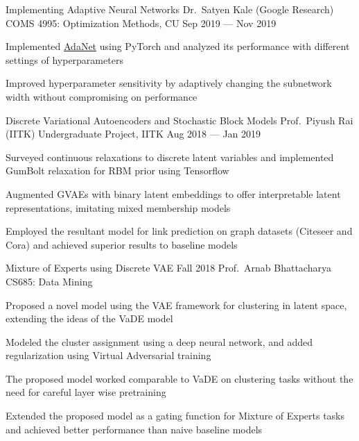 \cventry
	{Implementing Adaptive Neural Networks}
	{Dr.\ Satyen Kale (Google Research)}
	{COMS 4995: Optimization Methods, CU}
	{Sep 2019 --- Nov 2019}
	{%
		\begin{cvitems}
			\item Implemented \href{https://arxiv.org/abs/1607.01097}{AdaNet} using PyTorch and analyzed its performance with different settings of hyperparameters
			\item Improved hyperparameter sensitivity by adaptively changing the subnetwork width without compromising on performance
		\end{cvitems}
	}

\cventry
	{Discrete Variational Autoencoders and Stochastic Block Models}
    {Prof.\ Piyush Rai (IITK)}
	{Undergraduate Project, IITK}
	{Aug 2018 --- Jan 2019}
	{%
		\begin{cvitems}
			\item Surveyed continuous relaxations to discrete latent variables and implemented GumBolt relaxation for RBM prior using Tensorflow
			\item Augmented GVAEs with binary latent embeddings to offer interpretable latent representations, imitating mixed membership models
			\item Employed the resultant model for link prediction on graph datasets (Citeseer and Cora) and achieved superior results to baseline models
		\end{cvitems}
	}

\cventry
	{Mixture of Experts using Discrete VAE}
	{Fall 2018}
	{Prof.\ Arnab Bhattacharya}
	{CS685: Data Mining}
	{%
		\begin{cvitems}
            \item Proposed a novel model using the VAE framework for clustering in latent space, extending the ideas of the VaDE model
            \item Modeled the cluster assignment using a deep neural network, and added regularization using Virtual Adversarial training
            \item The proposed model worked comparable to VaDE on clustering tasks without the need for careful layer wise pretraining
            \item Extended the proposed model as a gating function for Mixture of Experts tasks and achieved better performance than naive baseline models
		\end{cvitems}
	}

